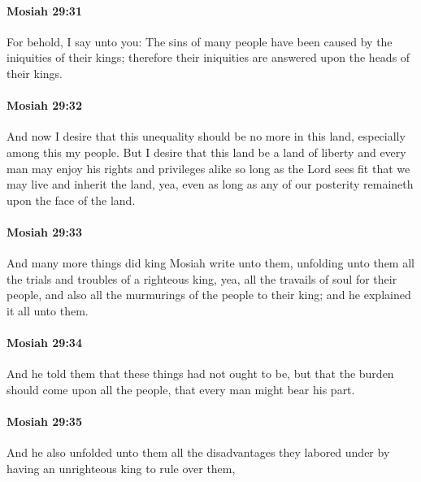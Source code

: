 		\paragraph{Mosiah 29:31} %
			\label{MOSIAH-29-31}

			For behold, I say unto you:
			The sins of many people have been caused by the iniquities of their kings;
			therefore their iniquities are answered upon the heads of their kings.

		\paragraph{Mosiah 29:32} %
			\label{MOSIAH-29-32}

			And now I desire that this unequality should be no more in this land,
			especially among this my people.
			But I desire that this land be a land of liberty
			and every man may enjoy his rights and privileges alike
			so long as the Lord sees fit that we may live and inherit the land,
			yea, even as long as any of our posterity remaineth upon the face of the land.

		\paragraph{Mosiah 29:33} %
			\label{MOSIAH-29-33}

			And many more things did king Mosiah write unto them,
			unfolding unto them all the trials and troubles of a righteous king,
			yea, all the travails of soul for their people,
			and also all the murmurings of the people to their king;
			and he explained it all unto them.

		\paragraph{Mosiah 29:34} %
			\label{MOSIAH-29-34}

			And he told them that these things had not ought to be,
			but that the burden should come upon all the people,
			that every man might bear his part.

		\paragraph{Mosiah 29:35} %
			\label{MOSIAH-29-35}

			And he also unfolded unto them all the disadvantages they labored under
			by having an unrighteous king to rule over them,

